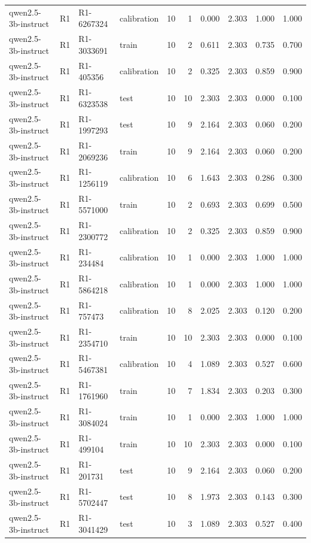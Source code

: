 \begin{table}
\begin{tabular}{llllrrrrrr}
qwen2.5-3b-instruct & R1 & R1-6267324 & calibration & 10 & 1 & 0.000 & 2.303 & 1.000 & 1.000 \\
qwen2.5-3b-instruct & R1 & R1-3033691 & train & 10 & 2 & 0.611 & 2.303 & 0.735 & 0.700 \\
qwen2.5-3b-instruct & R1 & R1-405356 & calibration & 10 & 2 & 0.325 & 2.303 & 0.859 & 0.900 \\
qwen2.5-3b-instruct & R1 & R1-6323538 & test & 10 & 10 & 2.303 & 2.303 & 0.000 & 0.100 \\
qwen2.5-3b-instruct & R1 & R1-1997293 & test & 10 & 9 & 2.164 & 2.303 & 0.060 & 0.200 \\
qwen2.5-3b-instruct & R1 & R1-2069236 & train & 10 & 9 & 2.164 & 2.303 & 0.060 & 0.200 \\
qwen2.5-3b-instruct & R1 & R1-1256119 & calibration & 10 & 6 & 1.643 & 2.303 & 0.286 & 0.300 \\
qwen2.5-3b-instruct & R1 & R1-5571000 & train & 10 & 2 & 0.693 & 2.303 & 0.699 & 0.500 \\
qwen2.5-3b-instruct & R1 & R1-2300772 & calibration & 10 & 2 & 0.325 & 2.303 & 0.859 & 0.900 \\
qwen2.5-3b-instruct & R1 & R1-234484 & calibration & 10 & 1 & 0.000 & 2.303 & 1.000 & 1.000 \\
qwen2.5-3b-instruct & R1 & R1-5864218 & calibration & 10 & 1 & 0.000 & 2.303 & 1.000 & 1.000 \\
qwen2.5-3b-instruct & R1 & R1-757473 & calibration & 10 & 8 & 2.025 & 2.303 & 0.120 & 0.200 \\
qwen2.5-3b-instruct & R1 & R1-2354710 & train & 10 & 10 & 2.303 & 2.303 & 0.000 & 0.100 \\
qwen2.5-3b-instruct & R1 & R1-5467381 & calibration & 10 & 4 & 1.089 & 2.303 & 0.527 & 0.600 \\
qwen2.5-3b-instruct & R1 & R1-1761960 & train & 10 & 7 & 1.834 & 2.303 & 0.203 & 0.300 \\
qwen2.5-3b-instruct & R1 & R1-3084024 & train & 10 & 1 & 0.000 & 2.303 & 1.000 & 1.000 \\
qwen2.5-3b-instruct & R1 & R1-499104 & train & 10 & 10 & 2.303 & 2.303 & 0.000 & 0.100 \\
qwen2.5-3b-instruct & R1 & R1-201731 & test & 10 & 9 & 2.164 & 2.303 & 0.060 & 0.200 \\
qwen2.5-3b-instruct & R1 & R1-5702447 & test & 10 & 8 & 1.973 & 2.303 & 0.143 & 0.300 \\
qwen2.5-3b-instruct & R1 & R1-3041429 & test & 10 & 3 & 1.089 & 2.303 & 0.527 & 0.400 \\

\end{tabular}
\end{table}
